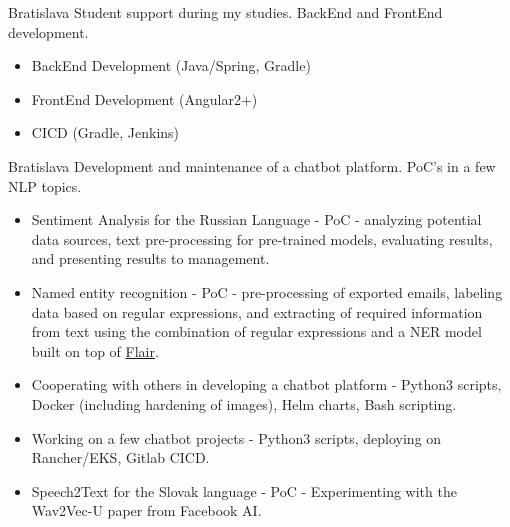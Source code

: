 \documentclass[10pt,a4paper]{altacv}
\begin{document}
 {Bratislava}
Student support during my studies. BackEnd and FrontEnd development.
\newline
\begin{itemize}
\item BackEnd Development (Java/Spring, Gradle)
\item FrontEnd Development (Angular2+)
\item CICD (Gradle, Jenkins)
\end{itemize}
\divider
{} {Bratislava}
Development and maintenance of a chatbot platform. PoC's in a few NLP topics.
\newline
\begin{itemize}
\item Sentiment Analysis for the Russian Language - PoC - analyzing potential data sources, text pre-processing for pre-trained models, evaluating results, and presenting results to management.
\item Named entity recognition - PoC - pre-processing of exported emails, labeling data based on regular expressions, and extracting of required information from text using the combination of regular expressions and a NER model built on top of \href{https://github.com/flairNLP/flair}{Flair}.
\item Cooperating with others in developing a chatbot platform - Python3 scripts, Docker (including hardening of images), Helm charts, Bash scripting.
\item Working on a few chatbot projects - Python3 scripts, deploying on Rancher/EKS, Gitlab CICD.
\item Speech2Text for the Slovak language - PoC - Experimenting with the Wav2Vec-U paper from Facebook AI. 
\end{itemize}
\divider
\end{document}
